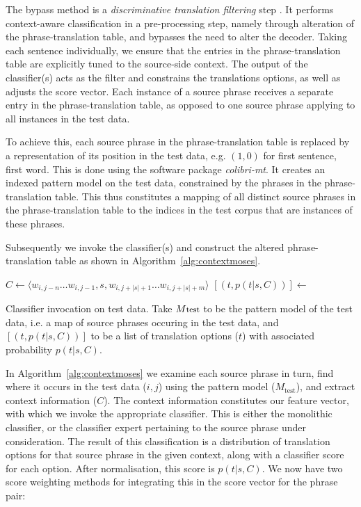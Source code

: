 The bypass method is a \emph{discriminative translation filtering}
step \citep{Rejwanul+11}. It performs context-aware classification in
a pre-processing step, namely through alteration of the
phrase-translation table, and bypasses the need to alter the
decoder. Taking each sentence individually, we ensure that the entries
in the phrase-translation table are explicitly tuned to the
source-side context. The output of the classifier(s) acts as the
filter and constrains the translations options, as well as adjusts the
score vector. Each instance of a source phrase receives a separate entry
in the phrase-translation table, as opposed to one source phrase
applying to all instances in the test data.

To achieve this, each source phrase in the phrase-translation table is
replaced by a representation of its position in the test data, e.g.
$(1,0)$ for first sentence, first word.  This is done using the
software package \emph{colibri-mt}. It creates an indexed pattern
model on the test data, constrained by the phrases in the
phrase-translation table. This thus constitutes a mapping of all
distinct source phrases in the phrase-translation table to the indices
in the test corpus that are instances of these phrases.

Subsequently we invoke the classifier(s) and construct the altered
phrase-translation table as shown in Algorithm~\ref{alg:contextmoses}.

\begin{algorithm}
\begin{algorithmic}
    \State $C \gets \langle w_{i,j-n} \ldots w_{i,j-1}, s, w_{i,j+|s|+1} \ldots w_{i,j+|s|+m} \rangle$
    \State $[(t, p(t|s,C) )] \gets$ 
  \EndFor
\EndFor
\end{algorithmic}
\caption{Classifier invocation on test data. Take $M{\footnotesize\text{test}}$ to be the pattern
model of the test data, i.e. a map of source phrases occuring in the test
data, and $[(t,p(t|s,C))]$ to be a list of translation options ($t$) with
associated probability $p(t|s,C)$.}
\label{alg:contextmoses}
\end{algorithm}

In Algorithm~\ref{alg:contextmoses} we examine each source phrase in turn, find
where it occurs in the test data ($i,j$) using the pattern model
($M_{\text{test}}$), and extract context information ($C$). The context
information constitutes our feature vector, with which we invoke the
appropriate classifier. This is either the monolithic classifier, or the
classifier expert pertaining to the source phrase under consideration. The
result of this classification is a distribution of translation options for that
source phrase in the given context, along with a classifier score for each
option. After normalisation, this score is $p(t|s,C)$. We now have two score
weighting methods for integrating this in the score vector for the phrase pair:

